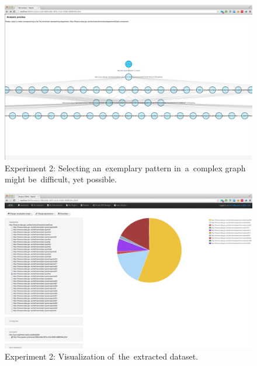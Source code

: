 \begin{figure}
  \centering
  \includegraphics[width=140mm]{img/payola-exp-02-pattern.png}
  \caption{Experiment 2: Selecting an~exemplary pattern in~a~complex graph might be~difficult, yet possible.}
  \label{fig:payola-exp-02-pattern}
\end{figure}

\begin{figure}
  \centering
  \includegraphics[width=140mm]{img/payola-exp-02-result.png}
  \caption{Experiment 2: Visualization of~the~extracted dataset.}
  \label{fig:payola-exp-02-result}
\end{figure}

